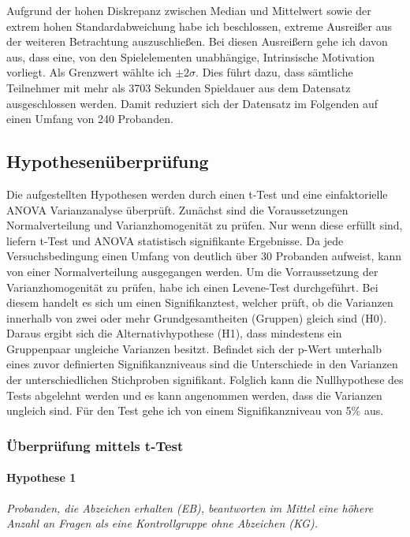 Aufgrund der hohen Diskrepanz zwischen Median und Mittelwert sowie der extrem hohen Standardabweichung habe ich beschlossen, extreme Ausreißer aus der weiteren Betrachtung auszuschließen. Bei diesen Ausreißern gehe ich davon aus, dass eine, von den Spielelementen unabhängige, Intrinsische Motivation vorliegt. Als Grenzwert wählte ich $\pm 2\sigma$. Dies führt dazu, dass sämtliche Teilnehmer mit mehr als 3703 Sekunden Spieldauer aus dem Datensatz ausgeschlossen werden. Damit reduziert sich der Datensatz im Folgenden auf einen Umfang von 240 Probanden.

\subsection{Hypothesenüberprüfung}\label{hypo}
Die aufgestellten Hypothesen werden durch einen t-Test und eine einfaktorielle  ANOVA  Varianzanalyse überprüft. Zunächst sind die Voraussetzungen Normalverteilung und Varianzhomogenität zu prüfen. Nur wenn diese erfüllt sind, liefern t-Test und ANOVA statistisch signifikante Ergebnisse. Da jede Versuchsbedingung einen Umfang von deutlich über 30 Probanden aufweist, kann von einer Normalverteilung ausgegangen werden. Um die Vorraussetzung der Varianzhomogenität zu prüfen, habe ich einen Levene-Test durchgeführt. Bei diesem handelt es sich um einen Signifikanztest, welcher prüft, ob die Varianzen innerhalb von zwei oder mehr Grundgesamtheiten (Gruppen) gleich sind (H0). Daraus ergibt sich die Alternativhypothese (H1), dass mindestens ein Gruppenpaar ungleiche Varianzen besitzt. Befindet sich der p-Wert unterhalb  eines zuvor definierten Signifikanzniveaus sind die Unterschiede in den Varianzen der unterschiedlichen Stichproben signifikant. Folglich kann die Nullhypothese des Tests abgelehnt werden und es kann angenommen werden, dass die Varianzen ungleich sind. Für den Test gehe ich von einem Signifikanzniveau von 5\% aus. 

\subsubsection{Überprüfung mittels t-Test}

\paragraph{Hypothese 1 }
\begin{center}
    \textit{Probanden, die Abzeichen erhalten (EB), beantworten im Mittel eine höhere Anzahl an Fragen als eine Kontrollgruppe ohne Abzeichen (KG).} 
\end{center}


